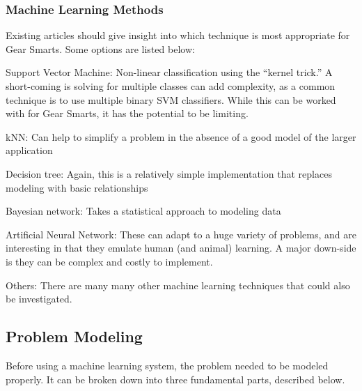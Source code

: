 \subsubsection{Machine Learning Methods}
\label{subsection:mloptions}
Existing articles should give insight into which technique is
most appropriate for Gear Smarts. Some options are listed below:

\begin{description}
  \item{Support Vector Machine:} Non-linear classification using the ``kernel trick.'' A short-coming is solving for multiple
  classes can add complexity, as a common technique is to use multiple binary SVM classifiers. While this can be worked with
  for Gear Smarts, it has the potential to be limiting.
  \item{kNN:} Can help to simplify a problem in the absence of a good model of the larger application
  \item{Decision tree:} Again, this is a relatively simple implementation that replaces modeling with basic relationships
  \item{Bayesian network:} Takes a statistical approach to modeling data
  \item{Artificial Neural Network:} These can adapt to a huge variety of problems, and are interesting in that they emulate
  human (and animal) learning. A major down-side is they can be complex and costly to implement.
  \item{Others:} There are many many other machine learning techniques that could also be investigated.
\end{description}

\subsection{Problem Modeling}
Before using a machine learning system, the problem needed to be modeled properly. It can be broken down into three
fundamental parts, described below.

